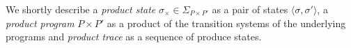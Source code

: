 We shortly describe a \emph{product state} $\sigma_{\times} \in \Sigma_{P \times P'}$ as a pair of states $\langle \sigma,\sigma' \rangle$, a \emph{product program} $P \times P'$ as a product of the transition systems of the underlying programs and \emph{product trace} as a sequence of produce states.

